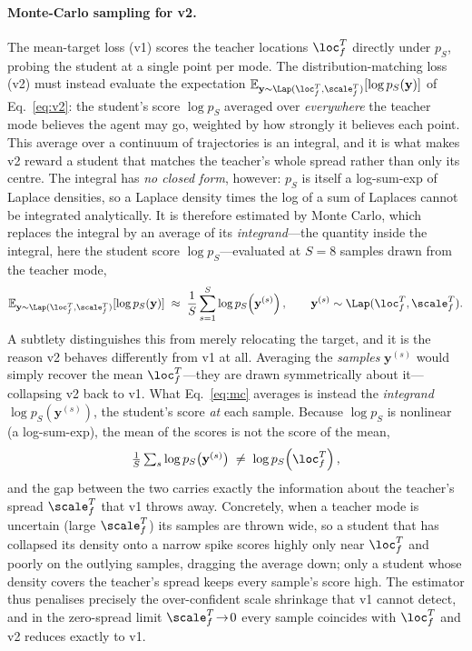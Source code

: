 \paragraph{Monte-Carlo sampling for v2.}
The mean-target loss (v1) scores the teacher locations $\loc^T_f$ directly under
$p_S$, probing the student at a single point per mode. The distribution-matching
loss (v2) must instead evaluate the expectation
$\mathbb{E}_{\mathbf{y}\sim\Lap(\loc^T_f,\scale^T_f)}[\log p_S(\mathbf{y})]$ of
Eq.~\ref{eq:v2}: the student's score $\log p_S$ averaged over \emph{everywhere} the
teacher mode believes the agent may go, weighted by how strongly it believes each
point. This average over a continuum of trajectories is an integral, and it is what
makes v2 reward a student that matches the teacher's whole spread rather than only
its centre. The integral has \emph{no closed form}, however: $p_S$ is itself a
log-sum-exp of Laplace densities, so a Laplace density times the log of a sum of
Laplaces cannot be integrated analytically. It is therefore estimated by Monte
Carlo, which replaces the integral by an average of its \emph{integrand}---the
quantity inside the integral, here the student score $\log p_S$---evaluated at
$S{=}8$ samples drawn from the teacher mode,
\begin{equation}
  \label{eq:mc}
  \mathbb{E}_{\mathbf{y}\sim\Lap(\loc^T_f,\scale^T_f)}[\log p_S(\mathbf{y})]
    \;\approx\; \frac{1}{S}\sum_{s=1}^{S}\log p_S\!\left(\mathbf{y}^{(s)}\right),
  \qquad
  \mathbf{y}^{(s)}\sim\Lap(\loc^T_f,\scale^T_f).
\end{equation}
A subtlety distinguishes this from merely relocating the target, and it is the
reason v2 behaves differently from v1 at all. Averaging the \emph{samples}
$\mathbf{y}^{(s)}$ would simply recover the mean $\loc^T_f$---they are drawn
symmetrically about it---collapsing v2 back to v1. What Eq.~\eqref{eq:mc} averages
is instead the \emph{integrand} $\log p_S(\mathbf{y}^{(s)})$, the student's score
\emph{at} each sample. Because $\log p_S$ is nonlinear (a log-sum-exp), the mean of
the scores is not the score of the mean,
\[
  \tfrac1S\textstyle\sum_s \log p_S\!\left(\mathbf{y}^{(s)}\right)
  \;\neq\; \log p_S\!\left(\loc^T_f\right),
\]
and the gap between the two carries exactly the information about the teacher's
spread $\scale^T_f$ that v1 throws away. Concretely, when a teacher mode is
uncertain (large $\scale^T_f$) its samples are thrown wide, so a student that has
collapsed its density onto a narrow spike scores highly only near $\loc^T_f$ and
poorly on the outlying samples, dragging the average down; only a student whose
density covers the teacher's spread keeps every sample's score high. The estimator
thus penalises precisely the over-confident scale shrinkage that v1 cannot detect,
and in the zero-spread limit $\scale^T_f\!\to\!0$ every sample coincides with
$\loc^T_f$ and v2 reduces exactly to v1.


